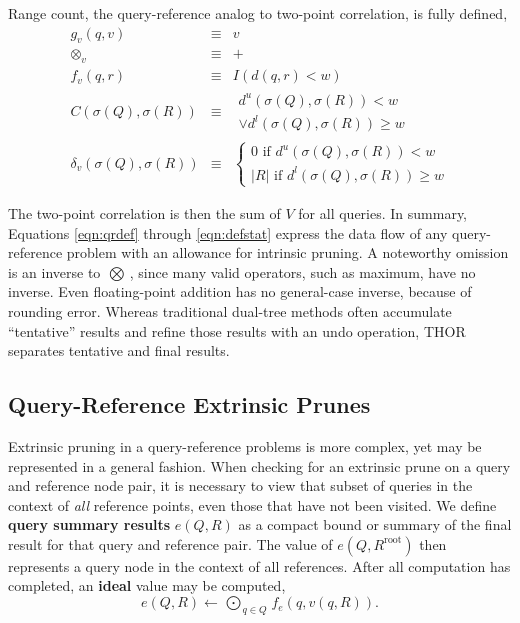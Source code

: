 \documentclass[twoside,leqno,twocolumn]{article}
\newcommand{\summary}{\delta}
\newcommand{\defterm}[1]{{\bf #1}}
\newcommand{\kdroot}[1]{#1^{\text{root}}}
\newcommand{\lo}[1]{#1^{l}}
\newcommand{\up}[1]{#1^{u}}
\newcommand{\distlo}{\lo{d}}
\newcommand{\distup}{\up{d}}
\newcommand{\dist}[2]{d(#1,#2)}
\newcommand{\nameOp}[2]{\mathop{#1\nolimits\!\!_{#2}}}
\newcommand{\nameop}[2]{#1_{\!#2}}
\newcommand{\myOp}[1]{\nameOp{\bigotimes}{#1}}
\newcommand{\myop}[1]{\nameop{\otimes}{#1}}
\newcommand{\letterqr}{v}
\newcommand{\outqr}{V}
\newcommand{\inqr}{v}
\newcommand{\Opqr}{\myOp{\letterqr}}
\newcommand{\opqr}{\myop{\letterqr}}
\newcommand{\fqr}{f_{\letterqr}}
\newcommand{\gqr}{g_{\letterqr}}
\newcommand{\letterqrv}{v}
\newcommand{\deltaqrv}{\summary_{\letterqrv}}
\newcommand{\canpruneqrv}{C}%
\newcommand{\lettermu}{e}
\newcommand{\inmu}{e}
\newcommand{\Outopmu}{\nameOp{\bigodot}{\lettermu}}%
\newcommand{\fmu}{f_{\lettermu}}
\newcommand{\outstat}{\sigma}
\begin{document}
\noindent
Range count, the query-reference analog to two-point correlation, is fully defined,
\begin{eqnarray*}
\gqr(q, \inqr) &\equiv& \inqr
\\
\opqr &\equiv& +
\\
\fqr(q,r) &\equiv& I(\dist{q}{r} < w)
\\
\canpruneqrv(\outstat(Q), \outstat(R))
&\equiv&
\begin{array}{l}\distup(\outstat(Q),\outstat(R)) < w \\ \vee \distlo(\outstat(Q),\outstat(R)) \geq w\end{array}
\\
\deltaqrv(\outstat(Q),\outstat(R)) &\equiv& \left\{ \begin{array}{l} 0 \text{ if } \distup(\outstat(Q),\outstat(R)) < w \\ |R| \text{ if } \distlo(\outstat(Q),\outstat(R)) \geq w \end{array}\right.
\end{eqnarray*}

\noindent
The two-point correlation is then the sum of $\outqr$ for all queries.
In summary, Equations \ref{eqn:qrdef} through \ref{eqn:defstat} express the data flow of any query-reference problem with an allowance for intrinsic pruning.
A noteworthy omission is an inverse to $\Opqr$, since many valid operators, such as maximum, have no inverse.
Even floating-point addition has no general-case inverse, because of rounding error.
Whereas traditional dual-tree methods often accumulate ``tentative'' results and refine those results with an undo operation, THOR separates tentative and final results.

\subsection{Query-Reference Extrinsic Prunes}

Extrinsic pruning in a query-reference problems is more complex, yet may be represented in a general fashion.
When checking for an extrinsic prune on a query and reference node pair, it is necessary to view that subset of queries in the context of {\em all} reference points, even those that have not been visited.
We define \defterm{query summary results} $\inmu(Q, R)$ as a compact bound or summary of the final result for that query and reference pair.
The value of $\inmu(Q, \kdroot{R})$ then represents a query node in the context of all references.
After all computation has completed, an \defterm{ideal} value may be computed,
\begin{equation*}
\inmu(Q, R) \gets \Outopmu_{q \in Q} \fmu(q, \inqr(q, R)).
\end{equation*}
\end{document}

